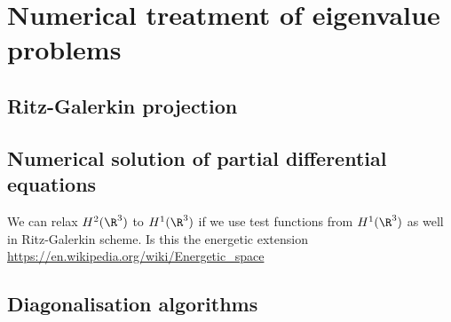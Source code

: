 \chapter{Numerical treatment of eigenvalue problems}



\section{Ritz-Galerkin projection}
% 

\section{Numerical solution of partial differential equations}
We can relax $H^2(\R^3)$ to $H^1(\R^3)$ if we use test functions
from $H^1(\R^3)$ as well in Ritz-Galerkin scheme.
Is this the energetic extension
\url{https://en.wikipedia.org/wiki/Energetic_space}




\section{Diagonalisation algorithms}
